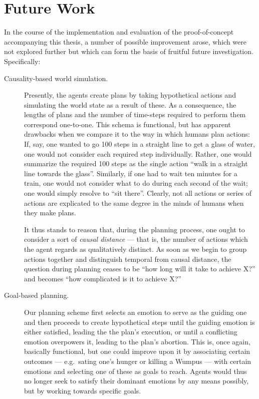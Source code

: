 \section{Future Work}\label{sec:futureWork}

In the course of the implementation and evaluation of the proof-of-concept accompanying this thesis, a number of possible improvement arose, which were not explored further but which can form the basis of fruitful future investigation. Specifically:

\begin{description}
	\item[Causality-based world simulation.] Presently, the agents create plans by taking hypothetical actions and simulating the world state as a result of these. As a consequence, the lengths of plans and the number of time-steps required to perform them correspond one-to-one.
	This schema is functional, but has apparent drawbacks when we compare it to the way in which humans plan actions: If, say, one wanted to go 100 steps in a straight line to get a glass of water, one would not consider each required step individually. Rather, one would summarize the required 100 steps as the single action ``walk in a straight line towards the glass''. Similarly, if one had to wait ten minutes for a train, one would not consider what to do during each second of the wait; one would simply resolve to ``sit there''. Clearly, not all actions or series of actions are explicated to the same degree in the minds of humans when they make plans.
	
	 It thus stands to reason that, during the planning process, one ought to consider a sort of {\em causal distance} --- that is, the number of actions which the agent regards as qualitatively distinct. As soon as we begin to group actions together and distinguish temporal from causal distance, the question during planning ceases to be ``how long will it take to achieve X?'' and becomes ``how complicated is it to achieve X?''
	 
	 \item[Goal-based planning.] Our planning scheme first selects an emotion to serve as the guiding one and then  proceeds to create hypothetical steps until the guiding emotion is either satisfied, leading the the plan's execution, or until a conflicting emotion overpowers it, leading to the plan's abortion. This is, once again, basically functional, but one could improve upon it by associating certain outcomes --- e.g.\ sating one's hunger or killing a Wumpus --- with certain emotions and selecting one of these as goals to reach. Agents would thus no longer seek to satisfy their dominant emotions by any means possibly, but by working towards specific goals. 
	 

\end{description}
